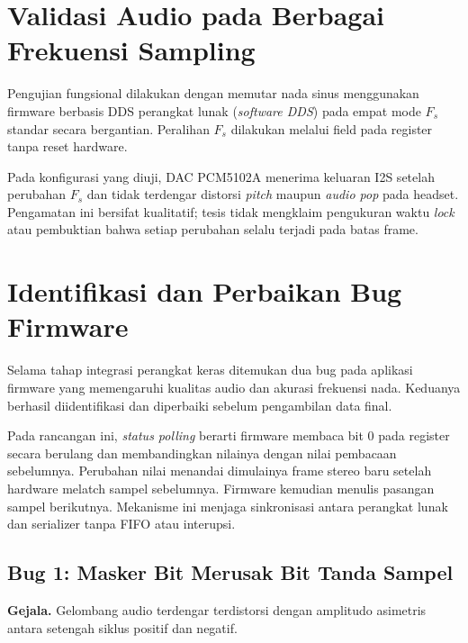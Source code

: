 \section{Validasi Audio pada Berbagai Frekuensi Sampling}

Pengujian fungsional dilakukan dengan memutar nada sinus menggunakan firmware berbasis DDS perangkat lunak (\textit{software DDS}) pada empat mode $F_s$ standar secara bergantian. Peralihan $F_s$ dilakukan melalui field  pada register  tanpa reset hardware.

Pada konfigurasi yang diuji, DAC PCM5102A menerima keluaran I2S setelah perubahan $F_s$ dan tidak terdengar distorsi \textit{pitch} maupun \textit{audio pop} pada headset. Pengamatan ini bersifat kualitatif; tesis tidak mengklaim pengukuran waktu \textit{lock} atau pembuktian bahwa setiap perubahan  selalu terjadi pada batas frame.

\section{Identifikasi dan Perbaikan Bug Firmware}

Selama tahap integrasi perangkat keras ditemukan dua bug pada aplikasi firmware yang memengaruhi kualitas audio dan akurasi frekuensi nada. Keduanya berhasil diidentifikasi dan diperbaiki sebelum pengambilan data final.

Pada rancangan ini, \textit{status polling} berarti firmware membaca bit 0 pada register  secara berulang dan membandingkan nilainya dengan nilai pembacaan sebelumnya. Perubahan nilai menandai dimulainya frame stereo baru setelah hardware melatch sampel sebelumnya. Firmware kemudian menulis pasangan sampel berikutnya. Mekanisme ini menjaga sinkronisasi antara perangkat lunak dan serializer tanpa FIFO atau interupsi.

\subsection{Bug 1: Masker Bit Merusak Bit Tanda Sampel}

\textbf{Gejala.} Gelombang audio terdengar terdistorsi dengan amplitudo asimetris antara setengah siklus positif dan negatif.

